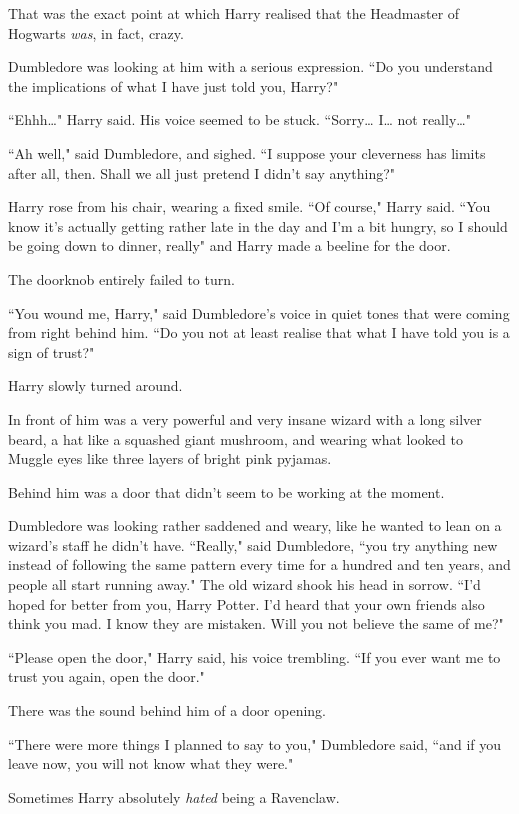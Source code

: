That was the exact point at which Harry realised that the Headmaster of Hogwarts \emph{was}, in fact, crazy.

Dumbledore was looking at him with a serious expression. ``Do you understand the implications of what I have just told you, Harry?"

``Ehhh{\ldots}" Harry said. His voice seemed to be stuck. ``Sorry{\ldots} I{\ldots} not really{\ldots}"

``Ah well," said Dumbledore, and sighed. ``I suppose your cleverness has limits after all, then. Shall we all just pretend I didn't say anything?"

Harry rose from his chair, wearing a fixed smile. ``Of course," Harry said. ``You know it's actually getting rather late in the day and I'm a bit hungry, so I should be going down to dinner, really" and Harry made a beeline for the door.

The doorknob entirely failed to turn.

``You wound me, Harry," said Dumbledore's voice in quiet tones that were coming from right behind him. ``Do you not at least realise that what I have told you is a sign of trust?"

Harry slowly turned around.

In front of him was a very powerful and very insane wizard with a long silver beard, a hat like a squashed giant mushroom, and wearing what looked to Muggle eyes like three layers of bright pink pyjamas.

Behind him was a door that didn't seem to be working at the moment.

Dumbledore was looking rather saddened and weary, like he wanted to lean on a wizard's staff he didn't have. ``Really," said Dumbledore, ``you try anything new instead of following the same pattern every time for a hundred and ten years, and people all start running away." The old wizard shook his head in sorrow. ``I'd hoped for better from you, Harry Potter. I'd heard that your own friends also think you mad. I know they are mistaken. Will you not believe the same of me?"

``Please open the door," Harry said, his voice trembling. ``If you ever want me to trust you again, open the door."

There was the sound behind him of a door opening.

``There were more things I planned to say to you," Dumbledore said, ``and if you leave now, you will not know what they were."

Sometimes Harry absolutely \emph{hated} being a Ravenclaw.

